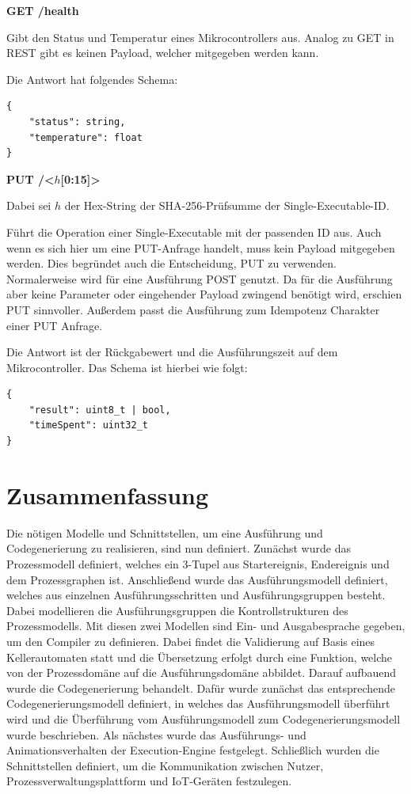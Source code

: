 \noindent \textbf{GET /health}


\noindent Gibt den Status und Temperatur eines Mikrocontrollers aus. Analog zu GET in \ac{REST} gibt es keinen Payload, welcher mitgegeben werden kann.

\noindent Die Antwort hat folgendes Schema:

\begin{lstlisting}[caption={Schema der Antwort beim \texttt{/health} Endpunkt}, label=lst:health-answer]
{
    "status": string,
    "temperature": float
}
\end{lstlisting}

\newpage

\noindent \textbf{PUT /<$h$[0:15]>}

\noindent Dabei sei $h$ der Hex-String der SHA-256-Prüfsumme der Single-Executable-ID.

\noindent Führt die Operation einer Single-Executable mit der passenden ID aus. Auch wenn es sich hier um eine PUT-Anfrage handelt, muss 
kein Payload mitgegeben werden. Dies begründet auch die Entscheidung, PUT zu verwenden. Normalerweise wird für eine Ausführung POST
genutzt. Da für die Ausführung aber keine Parameter oder eingehender Payload zwingend benötigt wird, erschien PUT sinnvoller. Außerdem 
passt die Ausführung zum Idempotenz Charakter einer PUT Anfrage. \cite{burke_restful_2013}

\noindent Die Antwort ist der Rückgabewert und die Ausführungszeit auf dem Mikrocontroller. Das Schema
ist hierbei wie folgt:

\begin{lstlisting}[caption={Schema der Antwort bei Prozessschrittendpunkten}, label=lst:single-executable-answer]
{
    "result": uint8_t | bool, 
    "timeSpent": uint32_t
}
\end{lstlisting}

\section{Zusammenfassung}

Die nötigen Modelle und Schnittstellen, um eine Ausführung und Codegenerierung zu realisieren, sind nun definiert. Zunächst wurde das Prozessmodell definiert,
welches ein 3-Tupel aus Startereignis, Endereignis und dem Prozessgraphen ist. Anschließend wurde das Ausführungsmodell definiert, welches aus einzelnen Ausführungsschritten
und Ausführungsgruppen besteht. Dabei modellieren die Ausführungsgruppen die Kontrollstrukturen des Prozessmodells. Mit diesen zwei Modellen sind Ein- und Ausgabesprache gegeben,
um den Compiler zu definieren. Dabei findet die Validierung auf Basis eines Kellerautomaten statt und die Übersetzung erfolgt durch eine Funktion, welche von
der Prozessdomäne auf die Ausführungsdomäne abbildet. Darauf aufbauend wurde die Codegenerierung behandelt. Dafür wurde zunächst das entsprechende Codegenerierungsmodell definiert, in welches das Ausführungsmodell überführt wird und die Überführung vom Ausführungsmodell zum
Codegenerierungsmodell wurde beschrieben. Als nächstes wurde das Ausführungs- und Animationsverhalten der Execution-Engine festgelegt. Schließlich wurden die Schnittstellen definiert,
um die Kommunikation zwischen Nutzer, Prozessverwaltungsplattform und IoT-Geräten festzulegen.
